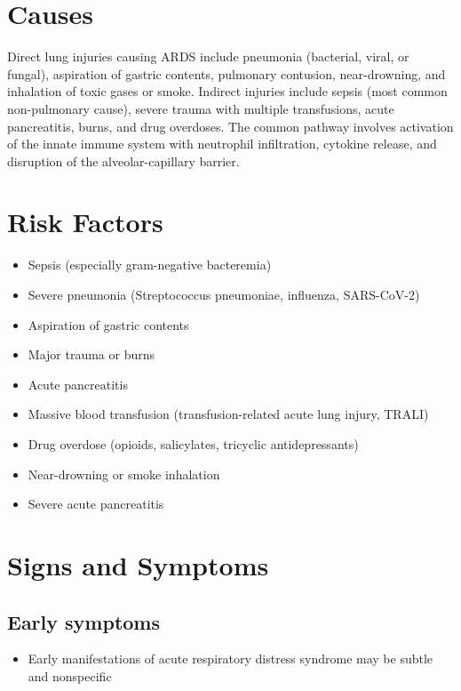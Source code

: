 \section{Causes}
Direct lung injuries causing ARDS include pneumonia (bacterial, viral, or fungal), aspiration of gastric contents, pulmonary contusion, near-drowning, and inhalation of toxic gases or smoke. Indirect injuries include sepsis (most common non-pulmonary cause), severe trauma with multiple transfusions, acute pancreatitis, burns, and drug overdoses. The common pathway involves activation of the innate immune system with neutrophil infiltration, cytokine release, and disruption of the alveolar-capillary barrier.

\section{Risk Factors}

\begin{itemize}[noitemsep]
  \item Sepsis (especially gram-negative bacteremia)
  \item Severe pneumonia (Streptococcus pneumoniae, influenza, SARS-CoV-2)
  \item Aspiration of gastric contents
  \item Major trauma or burns
  \item Acute pancreatitis
  \item Massive blood transfusion (transfusion-related acute lung injury, TRALI)
  \item Drug overdose (opioids, salicylates, tricyclic antidepressants)
  \item Near-drowning or smoke inhalation
  \item Severe acute pancreatitis
\end{itemize}

\section{Signs and Symptoms}

\subsection{Early symptoms}
\begin{itemize}[noitemsep]
  \item Early manifestations of acute respiratory distress syndrome may be subtle and nonspecific
\end{itemize}

